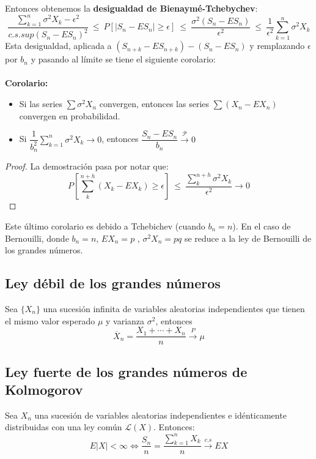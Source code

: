 \documentclass[12pt,a4paper]{book}
\begin{document}
Entonces obtenemos la \textbf{desigualdad de Bienaymé-Tchebychev}:
$$\frac{\displaystyle\sum_{k=1}^n \sigma^2 X_k-\epsilon ^2}{c.s.sup(S_n-ES_n)^2} 
\ \leq \ 
P[|S_n-ES_n|\geq \epsilon]
\ \leq \ 
\frac{\sigma^2(S_n-ES_n)}{\epsilon^2} 
\ \leq \ 
\frac{1}{\epsilon^2}\sum_{k=1}^n\sigma^2 X_k$$
Esta desigualdad, aplicada a $(S_{n+k}-ES_{n+k})-(S_n-ES_n)$ y remplazando $\epsilon$ por $b_n$ y pasando al límite se tiene el siguiente corolario:
\\\\
\textbf{Corolario: }
\begin{itemize}
\item Si las series $\sum\sigma^2 X_n$ convergen, entonces las series $\sum (X_n-EX_n)$ convergen en probabilidad.
\item Si $\dfrac{1}{b_n^2}\displaystyle\sum_{k=1}^n \sigma^2 X_k\rightarrow 0$, entonces $\dfrac{S_n - ES_n}{b_n}\stackrel{\mathcal{P}}{\rightarrow}0$\\
\end{itemize}
\begin{proof}
La demostración pasa por notar que:
$$P \left[\sum_{k}^{n+h}(X_k - EX_k)\geq\epsilon\right]
\ \leq \ \dfrac{\displaystyle\sum_{k}^{n+h}\sigma^2 X_k}{\epsilon^2}\longrightarrow 0$$
\end{proof}
Este último corolario es debido a Tchebichev (cuando $b_n=n$). En el caso de Bernouilli, donde $b_n=n$, $EX_n=p$ , $\sigma^2 X_n=pq$ se reduce a la ley de Bernouilli de los grandes números.


\subsection{Ley débil de los grandes números}
Sea $\{X_n\}$ una sucesión infinita de variables aleatorias independientes que tienen el mismo valor esperado $\mu$ y varianza $\sigma^2$, entonces 
$$
 \overline{X}_n = \frac{X_1+\cdots+X_n}{n} 
 \stackrel{P}{\longrightarrow} \mu
$$

\subsection{Ley fuerte de los grandes números de Kolmogorov}
Sea ${X_n}$ una sucesión de variables aleatorias independientes e idénticamente distribuidas con una ley común $\mathcal{L}(X)$. Entonces:
$$E|X| < \infty
\Longleftrightarrow 
\dfrac{S_n}{n}=\dfrac{\sum_{k=1}^n X_k}{n}\stackrel{c.s}{\longrightarrow}EX$$
\end{document}
